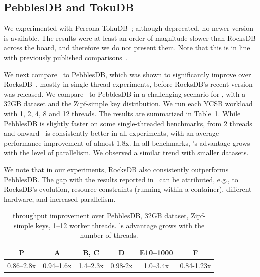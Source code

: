 
\subsection{PebblesDB and TokuDB}
\label{ssec:pebbles} 

We experimented with Percona TokuDB~\cite{TokuDBgit}; although deprecated, no newer version is available. 
The results were at least an order-of-magnitude slower than RocksDB across the board, and therefore we do not present them. 
Note that this is in line with previously published comparisons~\cite{DBLP:conf/cidr/DongCGBSS17,tucana,toku-rocks-inno}.

We next compare \sys\ to PebblesDB, which was shown to significantly improve over RocksDB~\cite{PebblesDB},
mostly in single-thread experiments, before RocksDB's recent version was released.  
We compare \sys\ to PebblesDB in a challenging  scenario for \sys, with a 32GB dataset and the Zipf-simple key 
distribution. We run each YCSB workload with 1, 2, 4, 8 and 12 threads. The results are summarized in Table~\ref{fig:pebbels-throughput}. 
While PebblesDB is slightly faster on some single-threaded benchmarks, from 2 threads and onward \sys\ is consistently better in all experiments, 
with an average performance improvement of almost 1.8x.  In all benchmarks, 
 \sys's advantage grows with the level of parallelism. 
We observed a similar trend with smaller datasets. 


We note that in our experiments, RocksDB also consistently outperforms PebblesDB. 
The gap with the results reported in~\cite{PebblesDB} 
can be attributed, e.g., to RocksDB's evolution, resource constraints (running within a 
container), different hardware, and increased  parallelism.   

\begin{table}
\centering
{\small{
\begin{tabular}{cccccc}
P & A & B, C & D& E10--1000 & F \\
\hline 
0.86--2.8x & 0.94--1.6x & 1.4--2.3x &  0.98-2x & 1.0--3.4x &  0.84-1.23x  \\
\end{tabular}
}}
\caption{{\sys\/ throughput improvement over PebblesDB, 32GB dataset, Zipf-simple keys, 1--12 worker threads.
\sys's advantage grows with the number of threads.}}
\label{fig:pebbels-throughput}
\end{table}

